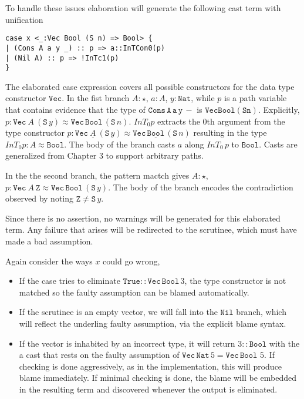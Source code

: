 To handle these issues elaboration will generate the following cast term with unification

\begin{lstlisting}[basicstyle={\ttfamily\small}]
case x <_:Vec Bool (S n) => Bool> {
| (Cons A a y _) :: p => a::InTCon0(p)
| (Nil A) :: p => !InTc1(p)
}
\end{lstlisting}

The elaborated case expression covers all possible constructors for the data type constructor $\mathtt{Vec}$. 
In the fist branch $A:\star$, $a:A$, $y:\mathtt{Nat}$, while $p$ is a path variable that contains evidence that the type of $\mathtt{Cons\,A\,a\,y\,-}$ is $\mathtt{Vec Bool (S n)}$.
Explicitly, $p:\mathtt{Vec}\ A\ (\mathtt{S}\,y)\approx\mathtt{Vec}\,\mathtt{Bool}\,(\mathtt{S}\,n)$.
$InT_{0}p$ extracts the 0th argument from the type constructor $p:\mathtt{Vec}\ \underline{A}\ (\mathtt{S}\,y)\approx\mathtt{Vec}\,\underline{\mathtt{Bool}}\,(\mathtt{S}\,n)$ resulting in the type $InT_{0}p:A\approx\mathtt{Bool}$.
The body of the branch casts $a$ along $InT_{0}\,p$ to $\mathtt{Bool}$.
Casts are generalized from Chapter 3 to support arbitrary paths.

In the the second branch, the pattern mactch gives $A:\star$, $p:\mathtt{Vec}\ A\ \mathtt{Z}\approx\mathtt{Vec}\,\mathtt{Bool}\,(\mathtt{S}\,y)$.
The body of the branch encodes the contradiction observed by noting $\mathtt{Z}\neq\mathtt{S}\,y$.

Since there is no assertion, no warnings will be generated for this elaborated term.
Any failure that arises will be redirected to the scrutinee, which must have made a bad assumption.

Again consider the ways $x$ could go wrong,
\begin{itemize}
\item 
If the case tries to eliminate $\mathtt{True}::\mathtt{Vec}\,\mathtt{Bool}\,3$, the type constructor is not matched so the faulty assumption can be blamed automatically.
\item 
If the scrutinee is an empty vector, we will fall into the $\mathtt{Nil}$ branch, which will reflect the underling faulty assumption, via the explicit blame syntax.
\item
If the vector is inhabited by an incorrect type, it will return $3::\mathtt{Bool}$ with the a cast that rests on the faulty assumption of $\mathtt{Vec}\,\mathtt{Nat}\,5=\mathtt{Vec}\,\mathtt{Bool}\,\,5$.
If checking is done aggressively, as in the implementation, this will produce blame immediately.
If minimal checking is done, the blame will be embedded in the resulting term and discovered whenever the output is eliminated.
\end{itemize}

